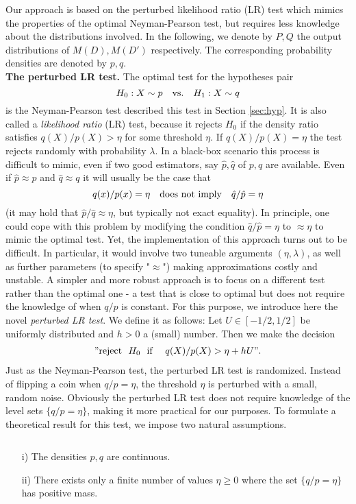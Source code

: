  
 Our approach is based on the perturbed likelihood ratio (LR) test which mimics the properties of the optimal Neyman-Pearson test, but requires less knowledge about the distributions involved. In the following, we denote by $P,Q$ the output distributions of $M(D), M(D')$ respectively. The corresponding probability densities are denoted by $p,q$.\\
\textbf{The perturbed LR test.} The optimal test for the hypotheses pair 
\[
H_0: X \sim p\quad \textnormal{vs.} \quad H_1: X \sim q
\]
is the Neyman-Pearson test described this test in Section \ref{sec:hyp}.  It is also called a \textit{likelihood ratio} (LR) test, because it rejects $H_0$ if the density ratio satisfies $q(X)/p(X)>\eta$ for some threshold $\eta$. If $q(X)/p(X)=\eta$ the test rejects randomly with probability $\lambda.$
In a black-box scenario this process is difficult to mimic, even if two good estimators, say $\hat p, \hat q$ of $p,q$ are available. Even if $\hat p \approx p$ and $\hat q \approx q$ it will usually be the case that
\[
q(x)/p(x) = \eta  \quad \textnormal{does not imply} \quad \hat q/ \hat p =\eta
\]
(it may hold that $\hat p/ \hat q \approx \eta $, but typically not exact equality). In principle, one could cope with this problem by modifying the condition $\hat q/ \hat p =\eta$ to $\approx \eta$ to mimic the optimal test. Yet, the implementation of this approach turns out to be difficult. In particular, it would involve two tuneable arguments $(\eta, \lambda)$, as well as further parameters (to specify "$\approx$") making approximations costly and unstable. A simpler and more robust approach is to focus on a different test rather than the optimal one - a test that is close to optimal but does not require the knowledge of when $q/p$ is constant. For this purpose, we introduce here the novel \textit{perturbed LR test}. 
We define it as follows: Let $U \in [-1/2, 1/2]$ be uniformly distributed and $h>0$ a (small) number. Then we make the decision
\begin{align} \label{e:PLR}
"\textnormal{reject $\,\,H_0\,\,$ if } \quad q(X)/p(X)>\eta + h U".
\end{align}
Just as the Neyman-Pearson test, the perturbed LR test is randomized. Instead of flipping a coin when $q/p=\eta$, the threshold $\eta$ is perturbed with a small, random noise. Obviously the perturbed LR test does not require knowledge of the level sets $\{q/p=\eta\}$, making it more practical for our purposes.
To formulate a theoretical result for this test, we impose two natural assumptions.
\begin{ass} \label{ass1} $ $
    \begin{itemize}
        \item[i)] The densities $p,q$ are continuous.
        \item[ii)] There exists only a finite number of values $\eta \ge 0$ where the set $\{q/p=\eta\}$ has positive mass.
    \end{itemize}
\end{ass}

